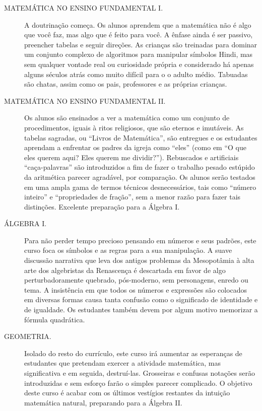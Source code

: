 \documentclass[a4paper,oneside,12pt,notitlepage]{article}
\begin{document}
\begin{description}
\item[MATEMÁTICA NO ENSINO FUNDAMENTAL I.]
A doutrinação começa.
Os alunos aprendem que a matemática não é algo que você faz, mas algo que é feito para você.
A ênfase ainda é ser passivo, preencher tabelas e seguir direções.
As crianças são treinadas para dominar um conjunto complexo de algoritmos para manipular símbolos Hindi, mas sem qualquer vontade real ou curiosidade própria e considerado há apenas alguns séculos atrás como muito difícil para o o adulto médio.
Tabuadas são chatas, assim como os pais, professores e as próprias crianças.

\item[MATEMÁTICA NO ENSINO FUNDAMENTAL II.]
Os alunos são ensinados a ver a matemática como um conjunto de procedimentos, iguais à ritos religiosos, que são eternos e imutáveis.
As tabelas sagradas, ou ``Livros de Matemática'', são entregues e os estudantes aprendam a enfrentar os padres da igreja como ``eles'' (como em ``O que eles querem aqui? Eles querem me dividir?'').
Rebuscados e artificiais ``caça-palavras'' são introduzidos a fim de  fazer o trabalho pesado estúpido da aritmética parecer agradável, por comparação.
Os alunos serão testados em uma ampla gama de termos técnicos desnecessários, tais como ``número inteiro'' e ``propriedades de fração'', sem a menor razão para fazer tais distinções.
Excelente preparação para a Álgebra I. 

\item[ÁLGEBRA I.]
Para não perder tempo precioso pensando em números e seus padrões, este curso foca os símbolos e as regras para a sua manipulação.
A suave discussão narrativa que leva dos antigos problemas da Mesopotâmia à alta arte dos algebristas da Renascença é descartada em favor de algo perturbadoramente quebrado, pós-moderno, sem personagens, enredo ou tema.
A insistência em que todos os números e expressões são colocados em diversas formas causa tanta confusão como o significado de identidade e de igualdade.
Os estudantes também devem por algum motivo memorizar a fórmula quadrática.

\item[GEOMETRIA.]
Isolado do resto do currículo, este curso irá aumentar as esperanças de estudantes que pretendam exercer a atividade matemática, mas significativa e em seguida, destruí-las.
Grosseiras e confusas notações serão introduzidas e sem esforço farão o simples parecer complicado.
O objetivo deste curso é acabar com os últimos vestígios restantes da intuição matemática natural, preparando para a Álgebra II.


\end{description}
\end{document}
